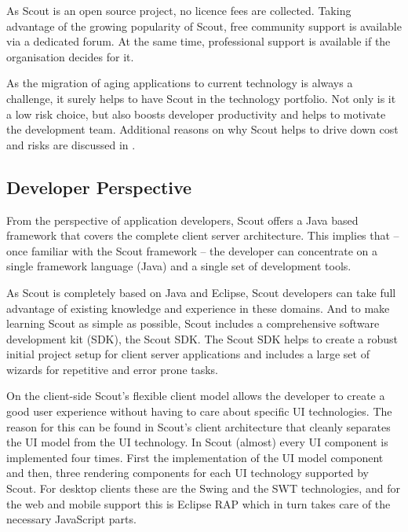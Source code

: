 \documentclass[a4paper,10pt,twoside]{book}
\begin{document}
As Scout is an open source project, no licence fees are collected. 
Taking advantage of the growing popularity of Scout, free community support is available via a dedicated forum. 
At the same time, professional support is available if the organisation decides for it.

As the migration of aging applications to current technology is always a challenge, it surely helps to have Scout in the technology portfolio. 
Not only is it a low risk choice, but also boosts developer productivity and helps to motivate the development team. 
Additional reasons on why Scout helps to drive down cost and risks are discussed in .

\subsection{Developer Perspective}

From the perspective of application developers, Scout offers a Java based framework that covers the complete client server architecture. 
This implies that -- once familiar with the Scout framework -- the developer can concentrate on a single framework language (Java) and a single set of development tools. 

As Scout is completely based on Java and Eclipse, Scout developers can take full advantage of existing knowledge and experience in these domains. 
And to make learning Scout as simple as possible, Scout includes a comprehensive software development kit (SDK), the Scout SDK.
The Scout SDK helps to create a robust initial project setup for client server applications and includes a large set of wizards for repetitive and error prone tasks.

On the client-side Scout's flexible client model allows the developer to create a good user experience without having to care about specific UI technologies. 
The reason for this can be found in Scout's client architecture that cleanly separates the UI model from the UI technology.
In Scout (almost) every UI component is implemented four times. 
First the implementation of the UI model component and then, three rendering components for each UI technology supported by Scout. 
For desktop clients these are the Swing and the SWT technologies, and for the web and mobile support this is Eclipse RAP which in turn takes care of the necessary JavaScript parts.  
\end{document}
